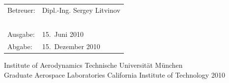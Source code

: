 \begin{center}
\vspace*{1.2cm}
\normalsize
\vfill
\begin{tabular}{ll}
Betreuer: &  Dipl.-Ing. Sergey Litvinov \\
\ & \ \\
Ausgabe: & 15.\ Juni 2010\\
Abgabe: & 15.\ Dezember 2010\\
\end{tabular}

\vspace*{1.6cm}
Institute of Aerodynamics Technische Universit\"{a}t M\"{u}nchen\\
Graduate Aerospace Laboratories California Institute of Technology
2010	
\end{center}

\pagebreak
\pagestyle{plain}

%

